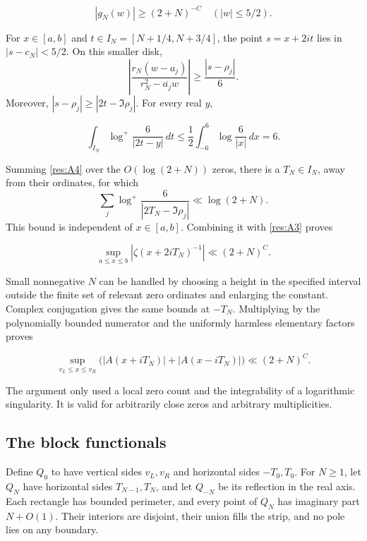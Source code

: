 \documentclass[11pt]{article}
\numberwithin{equation}{section}
\begin{document}
\begin{equation}\label{res:A3}
|g_N(w)|\geq(2+N)^{-C}
 \quad (|w|\leq5/2).
\end{equation}

For \(x\in[a,b]\) and \(t\in I_N=[N+1/4,N+3/4]\), the point \(s=x+2it\)
lies in \(|s-c_N|<5/2\). On this smaller disk, \[
 \left|\frac{r_N(w-a_j)}{r_N^2-\overline{a_j}w}\right|
 \geq \frac{|s-\rho_j|}{6}.
\] Moreover, \(|s-\rho_j|\geq|2t-\Im\rho_j|\). For every real \(y\),

\begin{equation}\label{res:A4}
\int_{I_N}\log^+\frac{6}{|2t-y|}\,dt
 \leq \frac12\int_{-6}^{6}\log\frac{6}{|x|}\,dx=6.
\end{equation}

Summing \eqref{res:A4} over the \(O(\log(2+N))\) zeros, there is a
\(T_N\in I_N\), away from their ordinates, for which \[
 \sum_j\log^+\frac{6}{|2T_N-\Im\rho_j|}
 \ll\log(2+N).
\] This bound is independent of \(x\in[a,b]\). Combining it with
\eqref{res:A3} proves

\begin{equation}\label{res:A5}
\sup_{a\leq x\leq b}|\zeta(x+2iT_N)^{-1}|
 \ll(2+N)^C.
\end{equation}

Small nonnegative \(N\) can be handled by choosing a height in the
specified interval outside the finite set of relevant zero ordinates and
enlarging the constant. Complex conjugation gives the same bounds at
\(-T_N\). Multiplying by the polynomially bounded numerator and the
uniformly harmless elementary factors proves

\begin{equation}\label{res:A6}
\sup_{v_L\leq x\leq v_R}
 \bigl(|A(x+iT_N)|+|A(x-iT_N)|\bigr)
 \ll(2+N)^C.
\end{equation}

The argument only used a local zero count and the integrability of a
logarithmic singularity. It is valid for arbitrarily close zeros and
arbitrary multiplicities.

\subsection{The block functionals}\label{the-block-functionals}

Define \(Q_0\) to have vertical sides \(v_L,v_R\) and horizontal sides
\(-T_0,T_0\). For \(N\geq1\), let \(Q_N\) have horizontal sides
\(T_{N-1},T_N\), and let \(Q_{-N}\) be its reflection in the real axis.
Each rectangle has bounded perimeter, and every point of \(Q_N\) has
imaginary part \(N+O(1)\). Their interiors are disjoint, their union
fills the strip, and no pole lies on any boundary.
\end{document}
